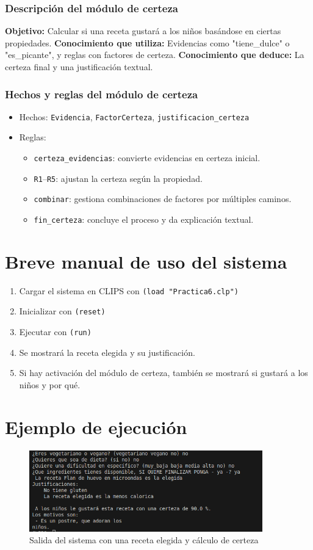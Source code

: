 \documentclass[a4paper,12pt]{article}
\begin{document}
\subsubsection{Descripción del módulo de certeza}
\textbf{Objetivo:} Calcular si una receta gustará a los niños basándose en ciertas propiedades.  
\textbf{Conocimiento que utiliza:} Evidencias como "tiene\_dulce" o "es\_picante", y reglas con factores de certeza.  
\textbf{Conocimiento que deduce:} La certeza final y una justificación textual.

\subsubsection{Hechos y reglas del módulo de certeza}
\begin{itemize}
  \item Hechos: \texttt{Evidencia}, \texttt{FactorCerteza}, \texttt{justificacion\_certeza}
  \item Reglas:
  \begin{itemize}
    \item \texttt{certeza\_evidencias}: convierte evidencias en certeza inicial.
    \item \texttt{R1}–\texttt{R5}: ajustan la certeza según la propiedad.
    \item \texttt{combinar}: gestiona combinaciones de factores por múltiples caminos.
    \item \texttt{fin\_certeza}: concluye el proceso y da explicación textual.
  \end{itemize}
\end{itemize}

\section{Breve manual de uso del sistema}
\begin{enumerate}
  \item Cargar el sistema en CLIPS con \texttt{(load "Practica6.clp")}
  \item Inicializar con \texttt{(reset)}
  \item Ejecutar con \texttt{(run)}
  \item Se mostrará la receta elegida y su justificación.
  \item Si hay activación del módulo de certeza, también se mostrará si gustará a los niños y por qué.
\end{enumerate}

\section*{Ejemplo de ejecución}
\begin{figure}[h!]
    \centering
    \includegraphics[width=0.9\textwidth]{captura1.png}
    \caption{Salida del sistema con una receta elegida y cálculo de certeza}
\end{figure}
\end{document}
